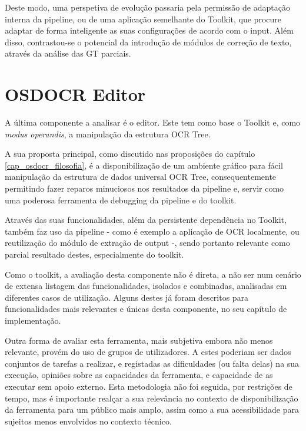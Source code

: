 Deste modo, uma perspetiva de evolução passaria pela permissão de adaptação interna da pipeline, ou de uma aplicação semelhante do Toolkit, que procure adaptar de forma inteligente as suas configurações de acordo com o input. Além disso, contrastou-se o potencial da introdução de módulos de correção de texto, através da análise das GT parciais.






\section{OSDOCR Editor}


A última componente a analisar é o editor. Este tem como base o Toolkit e, como \textit{modus operandis}, a manipulação da estrutura OCR Tree. 

A sua proposta principal, como discutido nas proposições do capítulo \ref{cap_osdocr_filosofia}, é a disponibilização de um ambiente gráfico para fácil manipulação da estrutura de dados universal OCR Tree, consequentemente permitindo fazer reparos minuciosos nos resultados da pipeline e, servir como uma poderosa ferramenta de debugging da pipeline e do toolkit.

Através das suas funcionalidades, além da persistente dependência no Toolkit, também faz uso da pipeline - como é exemplo a aplicação de OCR localmente, ou reutilização do módulo de extração de output -, sendo portanto relevante como parcial resultado destes, especialmente do toolkit.

Como o toolkit, a avaliação desta componente não é direta, a não ser num cenário de extensa listagem das funcionalidades, isolados e combinadas, analisadas em diferentes casos de utilização. Alguns destes já foram descritos para funcionalidades mais relevantes e únicas desta componente, no seu capítulo de implementação. 

Outra forma de avaliar esta ferramenta, mais subjetiva embora não menos relevante, provém do uso de grupos de utilizadores. A estes poderiam ser dados conjuntos de tarefas a realizar, e registadas as dificuldades (ou falta delas) na sua execução, opiniões sobre as capacidades da ferramenta, e capacidade de as executar sem apoio externo. Esta metodologia não foi seguida, por restrições de tempo, mas é importante realçar a sua relevância no contexto de disponibilização da ferramenta para um público mais amplo, assim como a sua acessibilidade para sujeitos menos envolvidos no contexto técnico.

